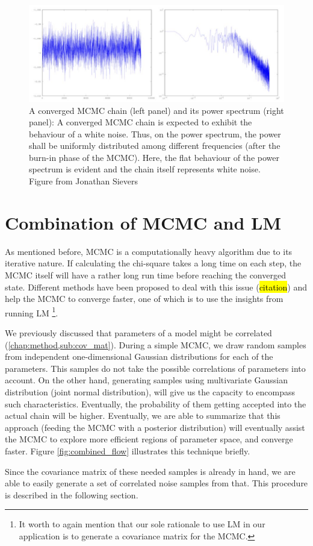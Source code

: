 \documentclass[12pt, TexShade, letterpaper]{report}
\begin{document}
\begin{figure}[h!]
\centering
\includegraphics[scale =0.9]{mcmc_converged.jpg}
\caption[A converged MCMC chain and its power spectrum]{A converged MCMC chain (left panel) and its power spectrum (right panel): A converged MCMC chain is expected to exhibit the behaviour of a white noise. Thus, on the power spectrum, the power shall be uniformly distributed among different frequencies (after the burn-in phase of the MCMC). Here, the flat behaviour of the power spectrum is evident and the chain itself represents white noise. Figure from Jonathan Sievers}
\label{fig:MCMC_converged}
\end{figure}

\section{Combination of MCMC and LM}
As mentioned before, MCMC is a computationally heavy algorithm due to its iterative nature. If calculating the chi-square takes a long time on each step, the MCMC itself will have a rather long run time before reaching the converged state. Different methods have been proposed to deal with this issue (\hl{citation}) and help the MCMC to converge faster, one of which is to use the insights from running LM \footnote{It worth to again mention that our sole rationale to use LM in our application is to generate a covariance matrix for the MCMC.}.\par
We previously discussed that parameters of a model might be correlated (\ref{chap:method,sub:cov_mat}). During a simple MCMC, we draw random samples from independent one-dimensional Gaussian distributions for each of the parameters. This samples do not take the possible correlations of parameters into account. On the other hand, generating samples using multivariate Gaussian distribution (joint normal distribution), will give us the capacity to encompass such characteristics. Eventually, the probability of them getting accepted into the actual chain will be higher. Eventually, we are able to summarize that this approach (feeding the MCMC with a posterior distribution) will eventually assist the MCMC to explore more efficient regions of parameter space, and converge faster. Figure \ref{fig:combined_flow} illustrates this technique briefly.\par
Since the covariance matrix of these needed samples is already in hand, we are able to easily generate a set of correlated noise samples from that. This procedure is described in the following section.\par
\end{document}
